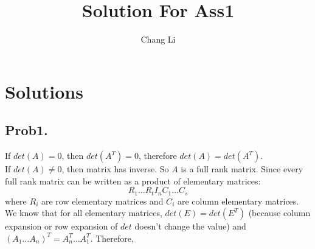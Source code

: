\documentclass[10pt,a4paper]{article}
\begin{document}
\title{Solution For Ass1}
\author{Chang Li}
\maketitle

\section{Solutions}

\subsection{Prob1.}
If $det(A) = 0$, then $det(A^T) = 0$, therefore $det(A) = det(A^T)$.\\
If $det(A) \neq 0$, then matrix has inverse. So $A$ is a full rank matrix. Since every full rank matrix can be written as a product of elementary matrices:
$$
R_1\dots R_tI_nC_1\dots C_s
$$
where $R_i$ are row elementary matrices and $C_i$ are column elementary matrices. We know that for all elementary matrices, $det(E) = det(E^T)$ (because column expansion or row expansion of $det$ doesn't change the value) and $(A_1\dots A_n)^T = A_n^T\dots A_1^T$. Therefore, 
\end{document}
